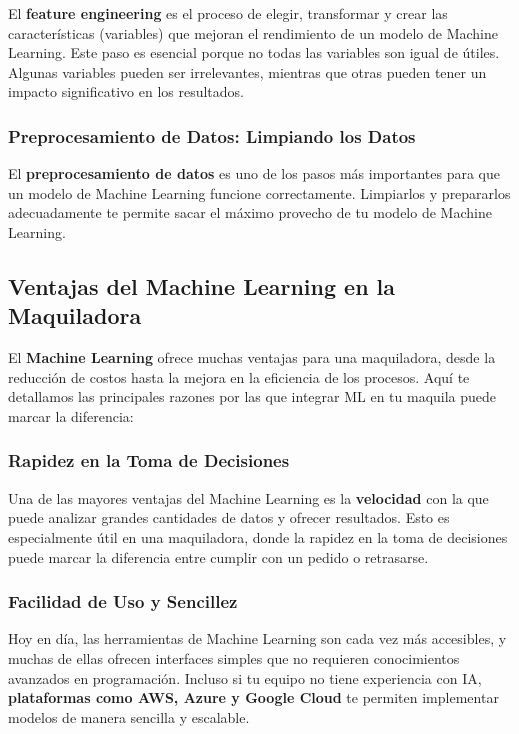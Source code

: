 El \textbf{feature engineering} es el proceso de elegir, transformar y crear las características (variables) que mejoran el rendimiento de un modelo de Machine Learning. Este paso es esencial porque no todas las variables son igual de útiles. Algunas variables pueden ser irrelevantes, mientras que otras pueden tener un impacto significativo en los resultados.

\subsubsection{\textbf{Preprocesamiento de Datos: Limpiando los Datos}}\label{preprocesamiento-de-datos-limpiando-los-datos}

El \textbf{preprocesamiento de datos} es uno de los pasos más importantes para que un modelo de Machine Learning funcione correctamente. Limpiarlos y prepararlos adecuadamente te permite sacar el máximo provecho de tu modelo de Machine Learning.

\subsection{\textbf{Ventajas del Machine Learning en la Maquiladora}}\label{ventajas-del-machine-learning-en-la-maquiladora}

El \textbf{Machine Learning} ofrece muchas ventajas para una maquiladora, desde la reducción de costos hasta la mejora en la eficiencia de los procesos. Aquí te detallamos las principales razones por las que integrar ML en tu maquila puede marcar la diferencia:

\subsubsection{\textbf{Rapidez en la Toma de Decisiones}}\label{rapidez-en-la-toma-de-decisiones}

Una de las mayores ventajas del Machine Learning es la \textbf{velocidad} con la que puede analizar grandes cantidades de datos y ofrecer resultados. Esto es especialmente útil en una maquiladora, donde la rapidez en la toma de decisiones puede marcar la diferencia entre cumplir con un pedido o retrasarse.

\subsubsection{\textbf{Facilidad de Uso y Sencillez}}\label{facilidad-de-uso-y-sencillez}

Hoy en día, las herramientas de Machine Learning son cada vez más accesibles, y muchas de ellas ofrecen interfaces simples que no requieren conocimientos avanzados en programación. Incluso si tu equipo no tiene experiencia con IA, \textbf{plataformas como AWS, Azure y Google Cloud} te permiten implementar modelos de manera sencilla y escalable.

